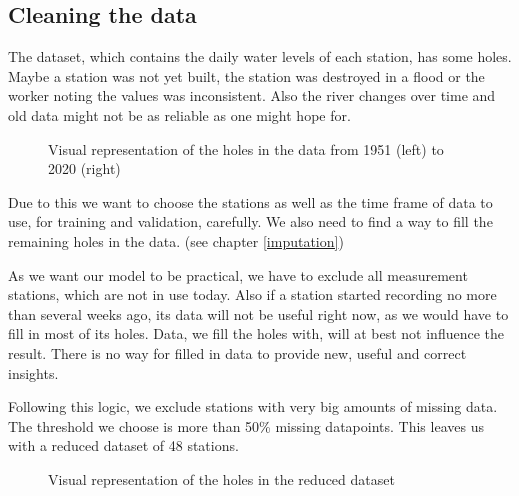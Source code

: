 \documentclass{article}
\begin{document}
\subsection{Cleaning the data}\label{clean}

The dataset, which contains the daily water levels of each station, has some
holes. Maybe a station was not yet built, the station was destroyed in a flood
or the worker noting the values was inconsistent. Also the river changes over
time and old data might not be as reliable as one might hope for.

\begin{figure}[h]
  \caption{Visual representation of the holes in the data from 1951 (left) to
  2020 (right)}
\end{figure}

Due to this we want to choose the stations as well as the time frame of data
to use, for training and validation, carefully. We also need to find a way to
fill the remaining holes in the data. (see chapter \ref{imputation})

As we want our model to be practical, we have to exclude all measurement
stations, which are not in use today. Also if a station started recording no
more than several weeks ago, its data will not be useful right now, as we
would have to fill in most of its holes. Data, we fill the holes with, will at
best not influence the result. There is no way for filled in data to provide
new, useful and correct insights.

Following this logic, we exclude stations with very big amounts of missing
data. The threshold we choose is more than 50\% missing datapoints. This
leaves us with a reduced dataset of 48 stations.

\begin{figure}[h]
  \caption{Visual representation of the holes in the reduced dataset}
\end{figure}
\end{document}
